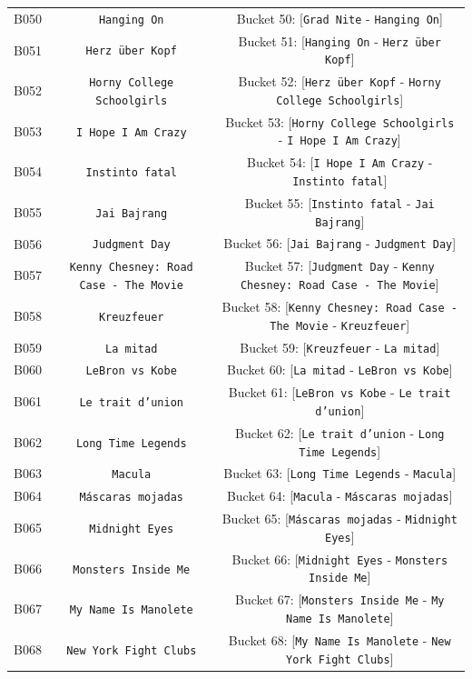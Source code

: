 \documentclass[11pt,a4paper]{article}
\begin{document}
{\begin{xltabular}{\textwidth}{l | C | C}
B050 & \texttt{Hanging On} & Bucket 50: [\texttt{Grad Nite} - \texttt{Hanging On}] \\
B051 & \texttt{Herz über Kopf} & Bucket 51: [\texttt{Hanging On} - \texttt{Herz über Kopf}] \\
B052 & \texttt{Horny College Schoolgirls} & Bucket 52: [\texttt{Herz über Kopf} - \texttt{Horny College Schoolgirls}] \\
B053 & \texttt{I Hope I Am Crazy} & Bucket 53: [\texttt{Horny College Schoolgirls} - \texttt{I Hope I Am Crazy}] \\
B054 & \texttt{Instinto fatal} & Bucket 54: [\texttt{I Hope I Am Crazy} - \texttt{Instinto fatal}] \\
B055 & \texttt{Jai Bajrang} & Bucket 55: [\texttt{Instinto fatal} - \texttt{Jai Bajrang}] \\
B056 & \texttt{Judgment Day} & Bucket 56: [\texttt{Jai Bajrang} - \texttt{Judgment Day}] \\
B057 & \texttt{Kenny Chesney: Road Case - The Movie} & Bucket 57: [\texttt{Judgment Day} - \texttt{Kenny Chesney: Road Case - The Movie}] \\
B058 & \texttt{Kreuzfeuer} & Bucket 58: [\texttt{Kenny Chesney: Road Case - The Movie} - \texttt{Kreuzfeuer}] \\
B059 & \texttt{La mitad} & Bucket 59: [\texttt{Kreuzfeuer} - \texttt{La mitad}] \\
B060 & \texttt{LeBron vs Kobe} & Bucket 60: [\texttt{La mitad} - \texttt{LeBron vs Kobe}] \\
B061 & \texttt{Le trait d'union} & Bucket 61: [\texttt{LeBron vs Kobe} - \texttt{Le trait d'union}] \\
B062 & \texttt{Long Time Legends} & Bucket 62: [\texttt{Le trait d'union} - \texttt{Long Time Legends}] \\
B063 & \texttt{Macula} & Bucket 63: [\texttt{Long Time Legends} - \texttt{Macula}] \\
B064 & \texttt{Máscaras mojadas} & Bucket 64: [\texttt{Macula} - \texttt{Máscaras mojadas}] \\
B065 & \texttt{Midnight Eyes} & Bucket 65: [\texttt{Máscaras mojadas} - \texttt{Midnight Eyes}] \\
B066 & \texttt{Monsters Inside Me} & Bucket 66: [\texttt{Midnight Eyes} - \texttt{Monsters Inside Me}] \\
B067 & \texttt{My Name Is Manolete} & Bucket 67: [\texttt{Monsters Inside Me} - \texttt{My Name Is Manolete}] \\
B068 & \texttt{New York Fight Clubs} & Bucket 68: [\texttt{My Name Is Manolete} - \texttt{New York Fight Clubs}] \\

\end{xltabular}}
\end{document}
